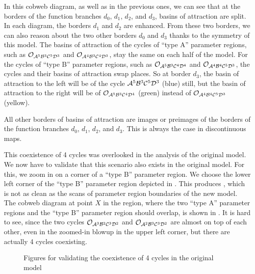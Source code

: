 In this cobweb diagram, as well as in the previous ones, we can see that at the borders of the function branches $d_0$, $d_1$, $d_2$, and $d_3$, basins of attraction are split.
In each diagram, the borders $d_1$ and $d_2$ are enhanced.
From these two borders, we can also reason about the two other borders $d_0$ and $d_3$ thanks to the symmetry of this model.
The basins of attraction of the cycles of ``type A'' parameter regions, such as $\mathcal{O}_{\mathcal{A}^5\mathcal{B}^3\mathcal{C}^5\mathcal{D}^3}$ and $\mathcal{O}_{\mathcal{A}^4\mathcal{B}^3\mathcal{C}^4\mathcal{D}^3}$, stay the same on each half of the model.
For the cycles of ``type B'' parameter regions, such as $\mathcal{O}_{\mathcal{A}^5\mathcal{B}^3\mathcal{C}^4\mathcal{D}^4}$ and $\mathcal{O}_{\mathcal{A}^4\mathcal{B}^4\mathcal{C}^5\mathcal{D}^3}$, the cycles and their basins of attraction swap places.
So at border $d_3$, the basin of attraction to the left will be of the cycle $\mathcal{A}^5\mathcal{B}^3\mathcal{C}^5\mathcal{D}^3$ (blue) still, but the basin of attraction to the right will be of $\mathcal{O}_{\mathcal{A}^5\mathcal{B}^3\mathcal{C}^4\mathcal{D}^4}$ (green) instead of $\mathcal{O}_{\mathcal{A}^4\mathcal{B}^4\mathcal{C}^5\mathcal{D}^3}$ (yellow).

All other borders of basins of attraction are images or preimages of the borders of the function branches $d_0$, $d_1$, $d_2$, and $d_3$.
This is always the case in discontinuous maps. 

This coexistence of 4 cycles was overlooked in the analysis of the original model.
We now have to validate that this scenario also exists in the original model.
For this, we zoom in on a corner of a ``type B'' parameter region.
We choose the lower left corner of the ``type B'' parameter region depicted in .
This produces , which is not as clean as the scans of parameter region boundaries of the new model.
The cobweb diagram at point $X$ in the region, where the two ``type A'' parameter regions and the ``type B'' parameter region should overlap, is shown in .
It is hard to see, since the two cycles $\mathcal{O}_{\mathcal{A}^3\mathcal{B}^2\mathcal{C}^3\mathcal{D}^2}$ and $\mathcal{O}_{\mathcal{A}^2\mathcal{B}^3\mathcal{C}^3\mathcal{D}^2}$ are almost on top of each other, even in the zoomed-in blowup in the upper left corner, but there are actually 4 cycles coexisting.

\begin{figure}
    \centering
    \caption{Figures for validating the coexistence of 4 cycles in the original model}
\end{figure}
